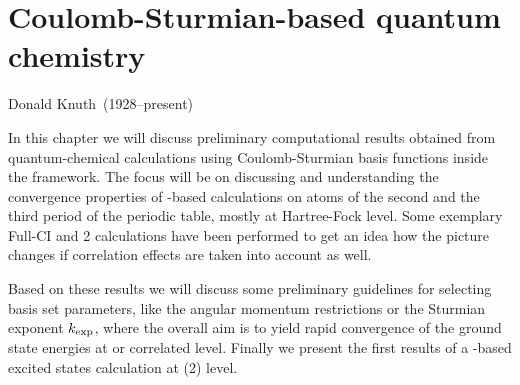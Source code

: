 \chapter{Coulomb-Sturmian-based quantum chemistry}
\label{ch:CSQChem}
{Donald Knuth~(1928--present)}

\noindent
In this chapter we will discuss preliminary computational results
obtained from quantum-chemical calculations using Coulomb-Sturmian
basis functions inside the \linebreak \molsturm framework.
The focus will be on discussing and understanding the convergence
properties of \CS-based calculations on atoms of
the second and the third period of the periodic table,
mostly at Hartree-Fock level.
Some exemplary Full-CI and {\MP}2 calculations have been performed
to get an idea how the picture changes
if correlation effects are taken into account as well.

Based on these results we will discuss some
preliminary guidelines for selecting \CS basis set parameters,
like the angular momentum restrictions or the Sturmian exponent $k_\text{exp}$,
where the overall aim is to yield rapid convergence
of the ground state energies at \HF or correlated level.
Finally we present the first results of a \CS-based
excited states calculation at {\ADC}(2) level.





% 
% 

